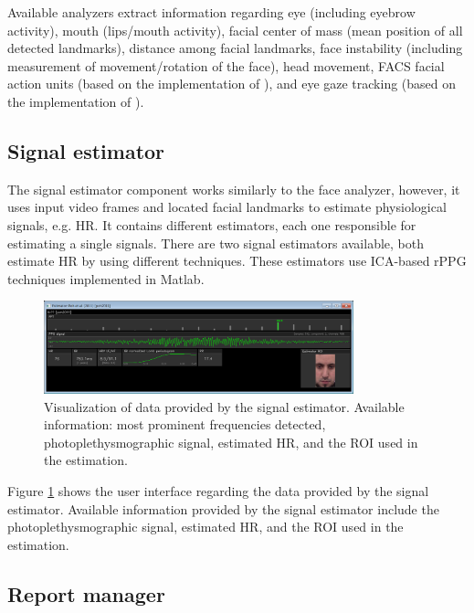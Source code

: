 Available analyzers extract information regarding eye (including eyebrow activity), mouth (lips/mouth activity), facial center of mass (mean position of all detected landmarks), distance among facial landmarks, face instability (including measurement of movement/rotation of the face), head movement, FACS facial action units (based on the implementation of \textcite{baltruvsaitis2015cross}), and eye gaze tracking (based on the implementation of \textcite{wood2015rendering}).

\subsection{Signal estimator}

The signal estimator component works similarly to the face analyzer, however, it uses input video frames and located facial landmarks to estimate physiological signals, e.g. HR. It contains different estimators, each one responsible for estimating a single signals. There are two signal estimators available, both estimate HR by using different techniques. These estimators use ICA-based rPPG techniques \parencite{poh2010non,poh2011advancements} implemented in Matlab.

\begin{figure}[h]
    \centering
    \includegraphics[width=0.8\textwidth]{Content/figures/tool-ui-signal-estimator.png}
    \caption{Visualization of data provided by the signal estimator. Available information: most prominent frequencies detected, photoplethysmographic signal, estimated HR, and the ROI used in the estimation.}
    \label{fig:tool-ui-signal-estimator}
\end{figure}

Figure \ref{fig:tool-ui-signal-estimator} shows the user interface regarding the data provided by the signal estimator. Available information provided by the signal estimator include the photoplethysmographic signal, estimated HR, and the ROI used in the estimation.

\subsection{Report manager}


